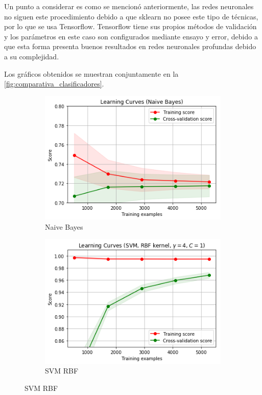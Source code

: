 Un punto a considerar es como se mencionó anteriormente, las redes neuronales no siguen este procedimiento debido a que sklearn no posee este tipo de técnicas, por lo que se usa Tensorflow. Tensorflow tiene sus propios métodos de validación y los parámetros en este caso son configurados mediante ensayo y error, debido a que esta forma presenta buenos resultados en redes neuronales profundas debido a su complejidad.

Los gráficos obtenidos se muestran conjuntamente en la \autoref{fig:comparativa_clasificadores}.

\begin{figure}[ht!]
\centering
\begin{subfigure}{.5\textwidth}
  \centering
  \includegraphics[width=.8\linewidth]{figures/NB.png}
  \caption{Naive Bayes}
  \label{fig:sub1}
\end{subfigure}%
\begin{subfigure}{.5\textwidth}
  \centering
  \includegraphics[width=.8\linewidth]{figures/SVM-RBF.png}
  \caption{SVM RBF}
  \label{fig:sub2}
\end{subfigure}


\end{figure}
